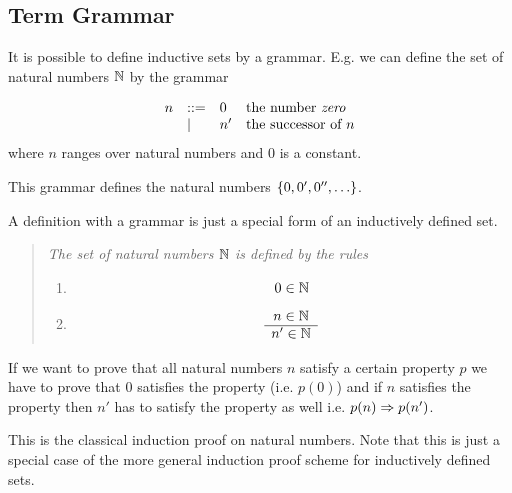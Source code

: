 \subsection{Term Grammar}

It is possible to define inductive sets by a grammar. E.g. we can define the set
of natural numbers ${\mathbb{N}}$ by the grammar


$$
\begin{array}{lllll}
    n
    &::= & 0 & \text{the number \emph{zero}}
    \\
    &\mid & n' & \text{the successor of $n$}
\end{array}
$$
where $n$ ranges over natural numbers and $0$ is a constant.

This grammar defines the natural numbers ${\{0, 0', 0'', \ldots\}}$.

A definition with a grammar is just a special form of an inductively defined
set.

\begin{quote}
    \emph{The set of natural numbers ${\mathbb{N}}$ is defined by the rules}
    \begin{enumerate}
    \item $$ 0 \in {\mathbb{N}} $$

    \item
        $$
        \begin{array}{c} 
            n \in {\mathbb{N}}
         \\ \hline 
            n' \in {\mathbb{N}}
        \end{array}
        $$
    \end{enumerate}
\end{quote}


If we want to prove that all natural numbers $n$ satisfy a certain property $p$
we have to prove that $0$ satisfies the property (i.e. $p(0)$) and if $n$
satisfies the property then $n'$ has to satisfy the property as well i.e. $p(n)
\Rightarrow p(n')$.

This is the classical induction proof on natural numbers. Note that this is just
a special case of the more general induction proof scheme for inductively
defined sets.
